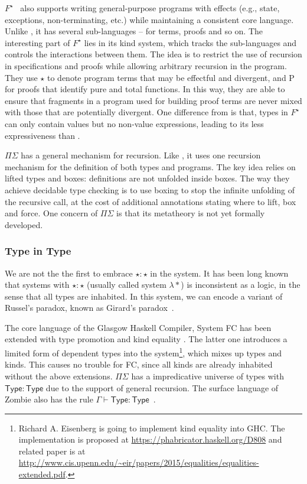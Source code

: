 $F^{\star}$~\cite{Swamy2011} also supports writing general-purpose programs with effects (e.g., state, exceptions, non-terminating, etc.) while maintaining a consistent core language. Unlike \name, it has several sub-languages -- for terms, proofs and so on. The interesting part of $F^{\star}$ lies in its kind system, which tracks the sub-languages and controls the interactions between them. The idea is to restrict the use of recursion in specifications and proofs while allowing arbitrary recursion in the program. They use $\star$ to denote program terms that may be effectful and divergent, and \textsf{P} for proofs that identify pure and total functions. In this way, they are able to ensure that fragments in a program used for building proof terms are never mixed with those that are potentially divergent. One difference from \name is that, types in $F^{\star}$ can only contain values but no non-value expressions, leading to its less expressiveness than \name.

$\Pi\Sigma$ has a general mechanism for recursion. Like \name, it uses one recursion mechanism for the definition of both types and programs. The key idea relies on lifted types and boxes: definitions are not unfolded inside boxes. The way they achieve decidable type checking is to use boxing to stop the infinite unfolding of the recursive call, at the cost of additional annotations stating where to lift, box and force. One concern of $\Pi\Sigma$ is that its metatheory is not yet formally developed.

\subsubsection{Type in Type}

We are not the the first to embrace $\star : \star$ in the system. It has been long known that systems with $\star : \star$ (usually called system $\lambda *$) is inconsistent as a logic, in the sense that all types are inhabited. In this system, we can encode a variant of Russel's paradox, known as Girard's paradox~\cite{coquand1986analysis}.

The core language of the Glasgow Haskell Compiler, System FC \cite{fc} has been extended with type promotion \cite{fc:pro} and kind equality \cite{fc:kind}. The latter one introduces a limited form of dependent types into the system\footnote{Richard A. Eisenberg is going to implement kind equality \cite{fc:kind} into GHC. The implementation is proposed at \url{https://phabricator.haskell.org/D808} and related paper is at \url{http://www.cis.upenn.edu/~eir/papers/2015/equalities/equalities-extended.pdf}.}, which mixes up types and kinds. This causes no trouble for FC, since all kinds are already inhabited without the above extensions. $\Pi\Sigma$ has a impredicative universe of types with $\mathsf{Type} : \mathsf{Type}$ due to the support of general recursion. The surface language of Zombie also has the rule $\Gamma \vdash \mathsf{Type} : \mathsf{Type}$~\cite{zombie:popl15}.

